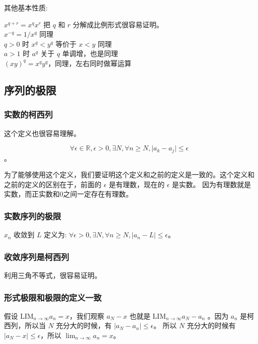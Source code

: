 其他基本性质:

$x^{q+r} = x^qx^r $ 把 $q$ 和 $r$ 分解成比例形式很容易证明。\\

$x^{-q} = 1/x^q $ 同理 \\

$q > 0$ 时 $x^q < y^q$ 等价于 $x < y$ 同理 \\

$a > 1$ 时 $a^q$ 关于 $q$ 单调增，也是同理 \\

$(xy)^q = x^q y ^ q $，同理，左右同时做幂运算

\subsection{序列的极限}

\subsubsection{实数的柯西列}

这个定义也很容易理解。

\[ \forall \epsilon \in \mathbb{R}, \epsilon >0, \exists N, \forall n \ge N, \lvert a_k - a_j \rvert \le \epsilon \]。

为了能够使用这个定义，我们要证明这个定义和之前的定义是一致的。这个定义和之前的定义的区别在于，前面的 $\epsilon $ 是有理数，现在的 $\epsilon$ 是实数。
因为有理数就是实数，而正实数和0之间一定存在有理数。

\subsubsection{实数序列的极限}

$x_n$ 收敛到 $L$ 定义为: $\forall \epsilon > 0, \exists N, \forall n \ge N, \lvert a_n -L \rvert \le \epsilon $。


\subsubsection{收敛序列是柯西列}

利用三角不等式，很容易证明。

\subsubsection{形式极限和极限的定义一致}

假设 $\mathrm{LIM}_{n \to \infty} a_n = x$，我们观察 $a_N - x$ 也就是 $\mathrm{LIM}_{n \to \infty} a_N - a_n$ 。因为 $a_n$ 是柯西列，所以当 $N$ 充分大的时候，有 $\lvert a_N - a_n \rvert \le \epsilon $。
所以 $N$ 充分大的时候有 $ \lvert a_N - x \rvert \le \epsilon $，所以 $\lim_{n \to \infty} a_n = x$。\\

